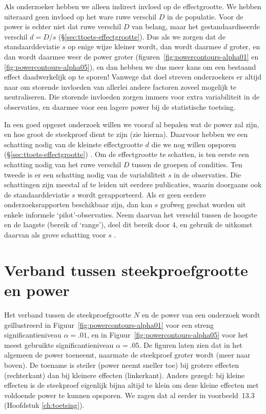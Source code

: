\documentclass[
]{book}
\begin{document}
Als onderzoeker hebben we alleen indirect invloed op de effectgrootte.
We hebben uiteraard geen invloed op het ware ruwe verschil \(D\) in de
populatie. Voor de power is echter niet dat ruwe verschil \(D\) van
belang, maar het gestandaardiseerde verschil \(d=D/s\)
(§\ref{sec:ttoets-effectgrootte}). Dus als we zorgen dat de
standaarddeviatie \(s\) op enige wijze kleiner wordt, dan wordt daarmee
\(d\) groter, en dan wordt daarmee weer de power groter
(figuren~\ref{fig:powercontours-alpha01} en \ref{fig:powercontours-alpha05}),
en dan hebben we dus meer kans
om een bestaand effect daadwerkelijk op te sporen! Vanwege dat doel
streven onderzoekers er altijd naar om storende invloeden van allerlei
andere factoren zoveel mogelijk te neutraliseren. Die storende invloeden
zorgen immers voor extra variabiliteit in de observaties, en daarmee
voor een lagere power bij de statistische toetsing.

In een goed opgezet onderzoek willen we vooraf al bepalen wat de power
zal zijn, en hoe groot de steekproef dient te zijn (zie hierna).
Daarvoor hebben we een schatting nodig van de kleinste effectgrootte \(d\)
die we nog willen opsporen
(§\ref{sec:ttoets-effectgrootte}) \citep{Quene10}. Om de effectgrootte te
schatten, is ten eerste een schatting nodig van het ruwe verschil \(D\)
tussen de groepen of condities. Ten tweede is er een schatting nodig van
de variabiliteit \(s\) in de observaties. Die schattingen zijn meestal af
te leiden uit eerdere publicaties, waarin doorgaans ook de
standaarddeviatie \(s\) wordt gerapporteerd. Als er geen eerdere
onderzoeksrapporten beschikbaar zijn, dan kan \(s\) grofweg geschat worden
uit enkele informele `pilot'-observaties. Neem daarvan het verschil
tussen de hoogste en de laagste (bereik of `range'), deel dit bereik
door 4, en gebruik de uitkomst daarvan als grove schatting voor \(s\)
\citep{PD08}.

\hypertarget{sec:steekproefgrootte-power}{%
\section{Verband tussen steekproefgrootte en power}\label{sec:steekproefgrootte-power}}

Het verband tussen de steekproefgrootte \(N\) en de power van een
onderzoek wordt geïllustreerd in
Figuur~\ref{fig:powercontours-alpha01} voor een streng
significantieniveau \(\alpha=.01\), en in
Figuur~\ref{fig:powercontours-alpha05} voor het meest gebruikte
significantieniveau \(\alpha=.05\). De figuren laten zien dat in het
algemeen de power toeneemt, naarmate de steekproef groter wordt (meer
naar boven). De toename is steiler (power neemt sneller toe) bij grotere
effecten (rechterkant) dan bij kleinere effecten (linkerkant). Anders gezegd: bij
kleine effecten is de steekproef eigenlijk bijna altijd te klein om deze
kleine effecten met voldoende power te kunnen opsporen. We zagen dat al
eerder in voorbeeld~13.3 (Hoofdstuk \ref{ch:toetsing}).
\end{document}
